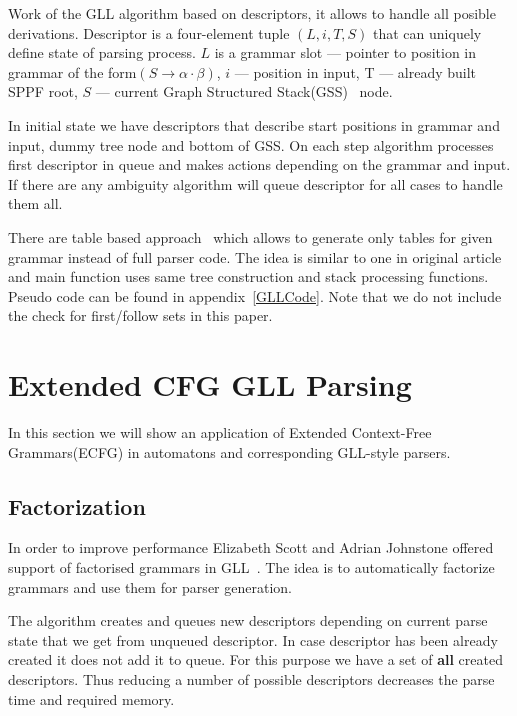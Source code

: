 \documentclass[runningheads,a4paper]{llncs}
\begin{document}
Work of the GLL algorithm based on descriptors, it allows to handle all posible derivations.
Descriptor is a four-element tuple $(L,i, T, S)$ that can uniquely define state of parsing process. 
$L$ is a grammar slot --- pointer to position in grammar of the form$(S \to \alpha \cdot \beta)$, $i$ --- position in input,
T --- already built SPPF root, $S$ --- current Graph Structured Stack(GSS)~\cite{GSS} node.

In initial state we have descriptors that describe start positions in grammar and input, dummy tree node and bottom of GSS.
On each step algorithm processes first descriptor in queue and makes actions depending on the grammar and input.
If there are any ambiguity algorithm will queue descriptor for all cases to handle them all. 

There are table based approach~\cite{ragozina} which allows to generate only tables for given grammar instead of full parser code.
The idea is similar to one in original article and main function uses same tree construction and stack processing functions.
Pseudo code can be found in appendix~\ref{GLLCode}. Note that we do not include the check for first/follow sets in this paper.




\section{Extended CFG GLL Parsing}%

In this section we will show an application of Extended Context-Free Grammars(ECFG) in automatons and corresponding GLL-style parsers.

\subsection{Factorization}%

In order to improve performance Elizabeth Scott and Adrian Johnstone offered support of factorised grammars in GLL~\cite{scott2016structuring}. 
The idea is to automatically factorize grammars and use them for parser generation. 

The algorithm creates and queues new descriptors depending on current parse state that we get from unqueued descriptor. 
In case descriptor has been already created it does not add it to queue. For this purpose we have a set of
\textbf{all} created descriptors. Thus reducing a number of possible descriptors decreases the parse time
and required memory.
\end{document}
